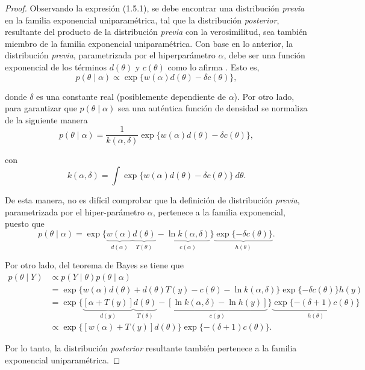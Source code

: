 \begin{proof}
Observando la expresión (1.5.1), se debe encontrar una distribución \emph{previa} en la familia exponencial uniparamétrica, tal que la distribución \emph{posterior}, resultante del producto de la distribución \emph{previa} con la verosimilitud, sea también miembro de la familia exponencial uniparamétrica. Con base en lo anterior, la distribución \emph{previa}, parametrizada por el hiperparámetro $\alpha$, debe ser una función exponencial de los términos $d(\theta)$ y $c(\theta)$ como lo afirma . Esto es,
\begin{equation}
p(\theta \mid \alpha)\propto\exp\{w(\alpha) d(\theta)-\delta c(\theta)\},
\end{equation}

donde $\delta$ es una constante real (posiblemente dependiente de $\alpha$). Por otro lado, para garantizar que $p(\theta \mid \alpha)$ sea una auténtica función de densidad se normaliza de la siguiente manera
\begin{equation}
p(\theta \mid \alpha)=\frac{1}{k(\alpha,\delta)}\exp\{w(\alpha) d(\theta)-\delta c(\theta)\},
\end{equation}

con
\begin{equation*}
k(\alpha,\delta)=\int\exp\{w(\alpha) d(\theta)-\delta c(\theta)\} \ d\theta.
\end{equation*}

De esta manera, no es difícil comprobar que la definición de distribución \emph{previa}, parametrizada por el hiper-parámetro $\alpha$, pertenece a la familia exponencial, puesto que
\begin{equation}
p(\theta \mid \alpha)=\exp\{\underbrace{w(\alpha)}_{d(\alpha)} \underbrace{d(\theta)}_{T(\theta)} - \underbrace{\ln k(\alpha,\delta)}_{c(\alpha)}\}\underbrace{\exp\{-\delta c(\theta)\}}_{h(\theta)}.
\end{equation}

Por otro lado, del teorema de Bayes se tiene que
\begin{align*}
p(\theta \mid Y) &\propto p(Y \mid \theta)p(\theta \mid \alpha)\\
&=\exp\{w(\alpha) d(\theta) + d(\theta)T(y) - c(\theta) -\ln k(\alpha,\delta) \}\exp\{-\delta c(\theta)\}h(y)\\
&=\exp\{\underbrace{[\alpha+T(y)]}_{d(y)} \underbrace{d(\theta)}_{T(\theta)} -\underbrace{[\ln k(\alpha,\delta)-\ln h(y)]}_{c(y)}\} \underbrace{\exp\{-(\delta+1) c(\theta)\}}_{h(\theta)}\\
&\propto \exp\{[w(\alpha)+T(y)] d(\theta)\}\exp\{-(\delta+1) c(\theta)\}.
\end{align*}

Por lo tanto, la distribución \emph{posterior} resultante también pertenece a la familia exponencial uniparamétrica.
\end{proof}

